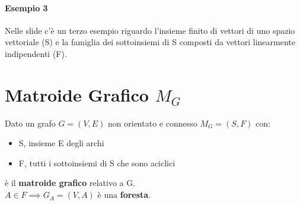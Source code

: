\paragraph*{Esempio 3} Nelle slide c'è un terzo esempio riguardo l'insieme finito di vettori
di uno spazio vettoriale (S) e la famiglia dei sottoinsiemi di S composti da vettori 
linearmente indipendenti (F).
\section{Matroide Grafico $M_G$}
Dato un grafo $G=(V,E)$ non orientato e connesso $M_G = (S,F)$ con:
\begin{itemize}
    \item S, insieme E degli archi
    \item F, tutti i sottoinsiemi di S che sono aciclici
\end{itemize}
è il \textbf{matroide grafico} relativo a G.\\
$A \in F \implies G_A = (V,A)$ è una \textbf{foresta}.
